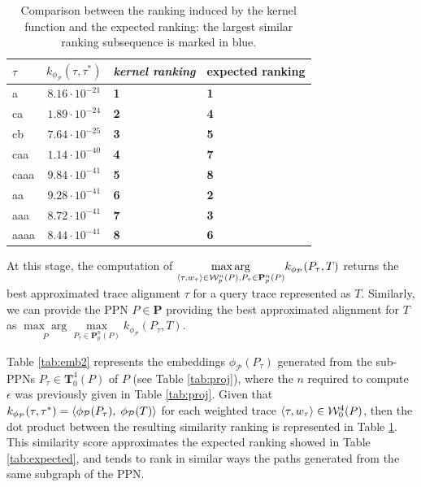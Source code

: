 \begin{table}
	\caption{Comparison between the ranking induced by the kernel function and the expected ranking: the largest similar ranking subsequence is marked in blue.}\label{tab:rank3}
	\centering
	\begin{tabular}{l|c|ll}
		\toprule
		$\tau$ & $k_{\phi_{\mathcal{P}}}(\tau,\tau^*)$ & \textit{kernel ranking} & expected ranking\\
		\midrule
		a & $8.16\cdot 10^{-21}$ & \textbf{1} & \textbf{\color{blue}1}\\
		ca & $1.89\cdot 10^{-24}$ & \textbf{2} & \textbf{\color{blue}4}\\
		cb & $7.64\cdot 10^{-25}$ & \textbf{3} & \textbf{\color{blue}5}\\
		caa & $1.14\cdot 10^{-40}$ & \textbf{4} & \textbf{\color{blue}7}\\
		caaa & $9.84\cdot 10^{-41}$ & \textbf{5} & \textbf{\color{blue}8}\\
		aa & $9.28\cdot 10^{-41}$ & \textbf{6} & \textbf{\color{red}2}\\
		aaa & $8.72\cdot 10^{-41}$ & \textbf{7} & \textbf{\color{red}3}\\
		aaaa & $8.44\cdot 10^{-41}$ & \textbf{8} & \textbf{\color{red}6}\\
		
		\bottomrule
	\end{tabular}
\end{table}


At this stage, the computation of $\underset{\braket{\tau,w_\tau}\in \mathcal{W}_p^n(P), P_\tau\in\mathbf{P}_p^n(P)}{\max\arg} k_{\phi_\mathcal{P}}(P_\tau, T)$ returns the best approximated trace alignment $\tau$ for a query trace represented as $T$. Similarly, we can provide the PPN $P\in\mathbf{P}$ providing the best approximated alignment for $T$ as $\underset{P}{\max\arg}\underset{ P_\tau\in\mathbf{P}_p^n(P)}{\max} k_{\phi_\mathcal{P}}(P_\tau, T)$. 

\begin{example}
	Table \ref{tab:emb2} represents the embeddings $\phi_{\mathcal{P}}(P_\tau)$ generated from the sub-PPNs $P_\tau\in \mathbf{T}_0^4(P)$ of $P$ (see Table \ref{tab:proj}), where the $n$ required to compute $\epsilon$ was previously given in Table \ref{tab:proj}. Given that $k_{\phi_{\mathcal{P}}}(\tau,\tau^*)=\braket{\phi_{\mathcal{P}}(P_\tau),\;\phi_{\mathcal{P}}(T)}$ for each weighted trace $\braket{\tau,w_\tau}\in\mathcal{W}_0^4(P)$, then the dot product between the resulting similarity ranking is represented in Table \ref{tab:rank3}. This similarity score approximates the expected ranking showed in Table \ref{tab:expected}, and tends to rank in similar ways the paths generated from the same subgraph of the PPN.
\end{example}
